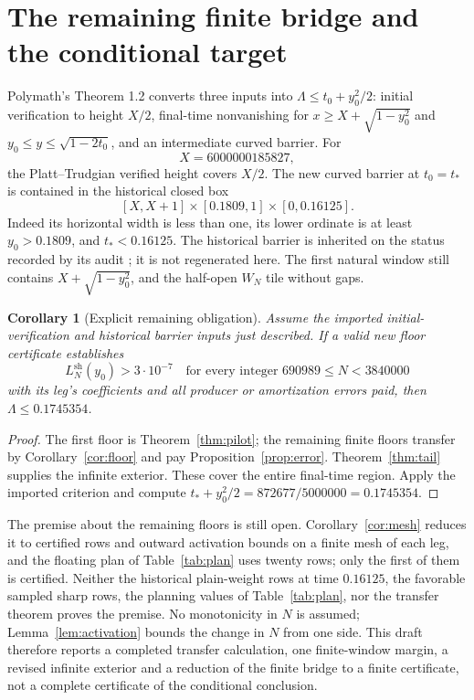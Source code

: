 \documentclass[11pt]{article}
\newtheorem{corollary}[theorem]{Corollary}
\theoremstyle{remark}
\newcommand{\tstar}{t_*}
\numberwithin{equation}{section}
\begin{document}
\section{The remaining finite bridge and the conditional target}\label{sec:remaining}

Polymath's Theorem 1.2 \cite{polymath} converts three inputs into
$\Lambda\le t_0+y_0^2/2$: initial verification to height $X/2$,
final-time nonvanishing for $x\ge X+\sqrt{1-y_0^2}$ and
$y_0\le y\le\sqrt{1-2t_0}$, and an intermediate curved barrier.
For
\[
 X=6000000185827,
\]
the Platt--Trudgian verified height \cite{platt} covers $X/2$.
The new curved barrier at $t_0=\tstar$ is contained in the historical
closed box
\[
 [X,X+1]\times[0.1809,1]\times[0,0.16125].
\]
Indeed its horizontal width is less than one, its lower ordinate is at
least $y_0>0.1809$, and $\tstar<0.16125$. The historical barrier is
inherited on the status recorded by its audit \cite{audit5}; it is not
regenerated here. The first natural window still contains
$X+\sqrt{1-y_0^2}$, and the half-open $W_N$ tile without gaps.

\begin{corollary}[Explicit remaining obligation]\label{cor:conditional}
Assume the imported initial-verification and historical barrier inputs
just described. If a valid new floor certificate establishes
\[
 L_N^{\mathrm{sh}}(y_0)>3\cdot10^{-7}
 \quad\text{for every integer }690989\le N<3840000
\]
with its leg's coefficients and all producer or amortization errors paid,
then $\Lambda\le0.1745354$.
\end{corollary}
\begin{proof}
The first floor is Theorem~\ref{thm:pilot}; the remaining finite floors
transfer by Corollary~\ref{cor:floor} and pay
Proposition~\ref{prop:error}. Theorem~\ref{thm:tail} supplies the infinite
exterior. These cover the entire final-time region. Apply the imported
criterion and compute
$\tstar+y_0^2/2=872677/5000000=0.1745354$.
\end{proof}

The premise about the remaining floors is still open.
Corollary~\ref{cor:mesh} reduces it to certified rows and outward
activation bounds on a finite mesh of each leg, and the floating plan of
Table~\ref{tab:plan} uses twenty rows; only the first of them is
certified. Neither the historical plain-weight rows at time $0.16125$, the
favorable sampled sharp rows, the planning values of
Table~\ref{tab:plan}, nor the transfer theorem proves the premise. No
monotonicity in $N$ is assumed; Lemma~\ref{lem:activation} bounds the
change in $N$ from one side. This draft therefore reports a completed
transfer calculation, one finite-window margin, a revised infinite
exterior and a reduction of the finite bridge to a finite certificate,
not a complete certificate of the conditional conclusion.
\end{document}
